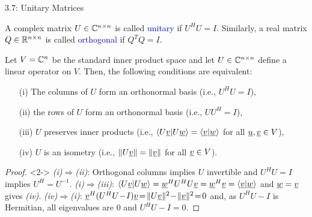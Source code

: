 \documentclass[10pt,letterpaper,english]{beamer}
\begin{document}
\begin{frame}{3.7: Unitary Matrices}

\begin{definition}
A complex matrix $U\in \mathbb{C}^{n\times n}$ is called \textcolor{blue}{unitary} if $U^H U = I$.
Similarly, a real matrix $Q\in \mathbb{R}^{n\times n}$ is called \textcolor{blue}{orthogonal} if $Q^T Q = I$.
\end{definition}

\begin{theorem}
Let $V = \mathbb{C}^n$ be the standard inner product space and let  $U\in \mathbb{C}^{n\times n}$ define a linear operator on $V$.
Then, the following conditions are equivalent:
\begin{enumerate}
\item[(i)] The columns of $U$ form an orthonormal basis (i.e.,  $U^H U = I$),
\item[(ii)] the rows of $U$ form an orthonormal basis (i.e.,  $U U^H = I$),
\item[(iii)] $U$ preserves inner products (i.e., $\langle U \underline{v} | U \underline{w} \rangle = \langle \underline{v} | \underline{w} \rangle$ for all $\underline{u},\underline{v}\in V$),
\item[(iv)] $U$ is an isometry (i.e., $\| U \underline{v} \| = \| \underline{v}\|$ for all $\underline{v} \in V$).
\end{enumerate}
\end{theorem}
\begin{proof}<2->
{\it(i)}$\Rightarrow${\it(ii)}: Orthogonal columns implies $U$ invertible and $U^H U = I$ implies $U^H = U^{-1}$.
{\it(i)}$\Rightarrow${\it(iii)}: $\langle U \underline{v} | U \underline{w} \rangle = \underline{w}^H U^H U \underline{v} = \underline{w}^H \underline{v} = \langle \underline{v} | \underline{w} \rangle$ and $\underline{w}=\underline{v}$ gives {\it(iv)}.
{\it(iv)}$\Rightarrow${\it(i)}:
$\vecnot{v}^H (U^H U \!-\! I) \vecnot{v} \!=\! \| U \vecnot{v} \|^2 \!-\! \| \vecnot{v} \|^2 \!=\! 0$
and, as $U^H U \!-\! I$ is Hermitian, all eigenvalues are 0 and $U^H U - I = 0$.
\end{proof}

\end{frame}
\end{document}

